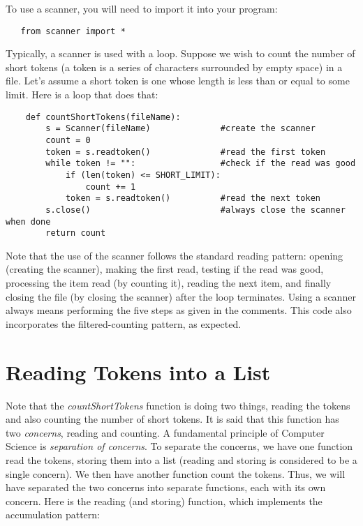 To use a scanner, you will need to import it into your program:

\begin{verbatim}
   from scanner import *
\end{verbatim}

Typically, a scanner is used with a loop. Suppose we wish to count the
number of 
short tokens (a token is a series of characters surrounded by empty space)
in a file. Let's assume a short token is one whose length is less
than or equal to some limit.
Here is a loop that does that:

\begin{verbatim}
    def countShortTokens(fileName):
        s = Scanner(fileName)              #create the scanner
        count = 0
        token = s.readtoken()              #read the first token
        while token != "":                 #check if the read was good
            if (len(token) <= SHORT_LIMIT):
                count += 1
            token = s.readtoken()          #read the next token
        s.close()                          #always close the scanner when done
        return count
\end{verbatim}

Note that the use of the scanner follows the standard reading pattern:
opening (creating the scanner),
making the first read, testing if the read was good, processing
the item read (by counting it), reading the next item, and finally
closing the file (by closing the scanner) after the loop terminates.
Using a scanner always means performing the five steps as given
in the comments.
This code also incorporates the filtered-counting pattern, as expected.

\section{Reading Tokens into a List}

Note that the {\it countShortTokens} function is doing two things, reading
the tokens and also counting the number of short tokens. It is said that this
function has two {\it concerns}, reading and counting. A
fundamental principle of Computer Science is {\it separation of
concerns}.
To separate the concerns, we have one function read the tokens,
storing them into a list (reading and storing is considered to
be a single concern).
We then have another function count the tokens. Thus, we will
have separated the two concerns into separate functions, each
with its own concern.
Here is the reading (and storing) function, which implements
the accumulation pattern:

